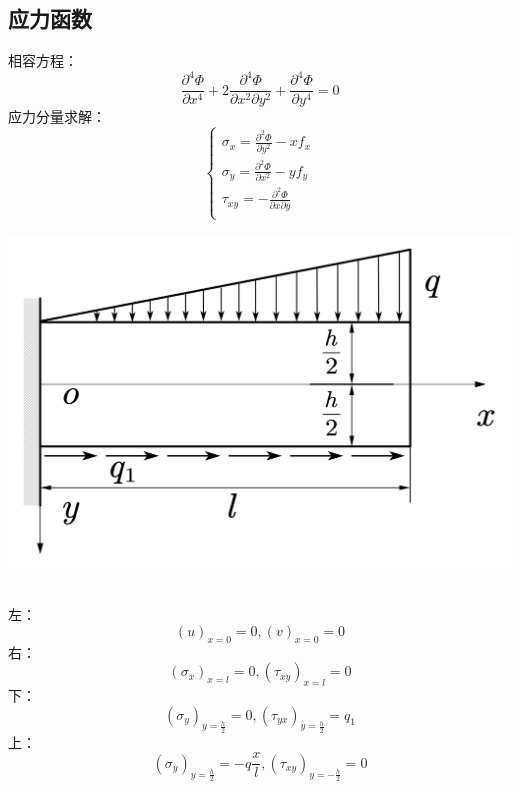 \subsection{应力函数}
相容方程：
\begin{equation}
	\frac{\partial ^4\varPhi}{\partial x^4}+2\frac{\partial ^4\varPhi}{\partial x^2\partial y^2}+\frac{\partial ^4\varPhi}{\partial y^4}=0
\end{equation}
\hspace*{2em}应力分量求解：
\begin{equation}
	\begin{cases}
	\sigma _x=\frac{\partial ^2\varPhi}{\partial y^2}-xf_x\\
	\sigma _y=\frac{\partial ^2\varPhi}{\partial x^2}-yf_y\\
	\tau _{xy}=-\frac{\partial ^2\varPhi}{\partial x\partial y}\\
	\end{cases}
\end{equation}
\begin{example}
\end{example}
	\centerline{\includegraphics[scale=0.45]{figure/2-1.png}}
\begin{remark}
	\quad\\
	左：\[\left( u \right) _{x=0}=0,\left( v \right) _{x=0}=0\]
	右：\[\left( \sigma _x \right) _{x=l}=0,\left( \tau _{xy} \right) _{x=l}=0\]
	下：\[\left( \sigma _y \right) _{y=\frac{h}{2}}=0,\left( \tau _{yx} \right) _{y=\frac{h}{2}}=q_1\]
	上：\[\left( \sigma _y \right) _{y=\frac{h}{2}}=-q\frac{x}{l},\left( \tau _{xy} \right) _{y=-\frac{h}{2}}=0\]
\end{remark}
\begin{example}
\end{example}
